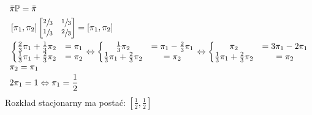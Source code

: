 \begin{align*}
&\bar{\pi}\mathbb{P}=\bar{\pi}\\
&\left[\pi _1, \pi _2\right]\begin{bmatrix}
\sfrac{2}{3}&\sfrac{1}{3}\\
\sfrac{1}{3}&\sfrac{2}{3}
\end{bmatrix} = \left[\pi _1, \pi _2\right]\\
&\left\{\begin{matrix}
\frac{2}{3}\pi _1 + \frac{1}{3}\pi _2 &= \pi _1\\
\frac{1}{3}\pi _1 + \frac{2}{3}\pi _2 &= \pi _2
\end{matrix}\right.\Leftrightarrow \left\{\begin{matrix}
\frac{1}{3}\pi _2 &= \pi _1-\frac{2}{3}\pi _1\\
\frac{1}{3}\pi _1+ \frac{2}{3}\pi _2 &= \pi _2
\end{matrix}\right.\Leftrightarrow \left\{\begin{matrix}
\pi _2 &= 3\pi _1-2\pi _1\\
\frac{1}{3}\pi _1 + \frac{2}{3}\pi _2 &= \pi _2
\end{matrix}\right.\\
&\pi _2 = \pi _1\\
&2\pi _1 = 1 \Leftrightarrow \pi _1 = \frac{1}{2}
\end{align*} 
Rozkład stacjonarny ma postać: $\left[\frac{1}{2}, \frac{1}{2}\right]$

